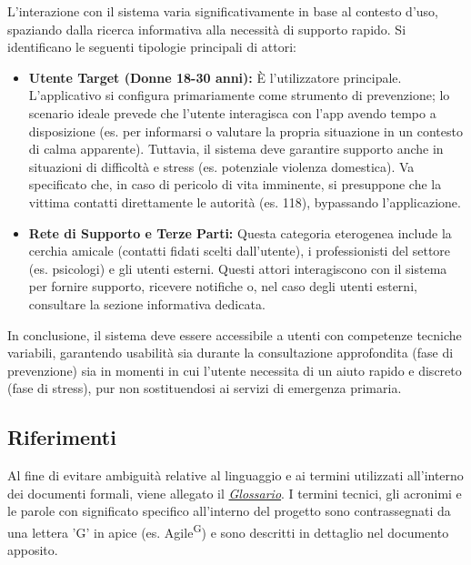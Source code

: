 \documentclass[a4paper,12pt]{article}
\begin{document}
L'interazione con il sistema varia significativamente in base al contesto d'uso, spaziando dalla ricerca informativa alla necessità di supporto rapido. Si identificano le seguenti tipologie principali di attori:

\begin{itemize}
    \item \textbf{Utente Target (Donne 18-30 anni):} È l'utilizzatore principale. L'applicativo si configura primariamente come strumento di prevenzione; lo scenario ideale prevede che l'utente interagisca con l'app avendo tempo a disposizione (es. per informarsi o valutare la propria situazione in un contesto di calma apparente).
    Tuttavia, il sistema deve garantire supporto anche in situazioni di difficoltà e stress (es. potenziale violenza domestica). Va specificato che, in caso di pericolo di vita imminente, si presuppone che la vittima contatti direttamente le autorità (es. 118), bypassando l'applicazione.
    
    \item \textbf{Rete di Supporto e Terze Parti:} Questa categoria eterogenea include la cerchia amicale (contatti fidati scelti dall'utente), i professionisti del settore (es. psicologi) e gli utenti esterni. Questi attori interagiscono con il sistema per fornire supporto, ricevere notifiche o, nel caso degli utenti esterni, consultare la sezione informativa dedicata.
\end{itemize}

In conclusione, il sistema deve essere accessibile a utenti con competenze tecniche variabili, garantendo usabilità sia durante la consultazione approfondita (fase di prevenzione) sia in momenti in cui l'utente necessita di un aiuto rapido e discreto (fase di stress), pur non sostituendosi ai servizi di emergenza primaria.


\subsection{Riferimenti} \label{sec:riferimenti}



Al fine di evitare ambiguità relative al linguaggio e ai termini utilizzati all'interno dei documenti formali, viene allegato il \href{https://swe-bitbybit.github.io/SWE-docs/docs/documenti_interni/Glossario.pdf}{\textit{Glossario}}.
I termini tecnici, gli acronimi e le parole con significato specifico all'interno del progetto sono contrassegnati da una lettera 'G' in apice (es. Agile\textsuperscript{G}) e sono descritti in dettaglio nel documento apposito.
\end{document}
